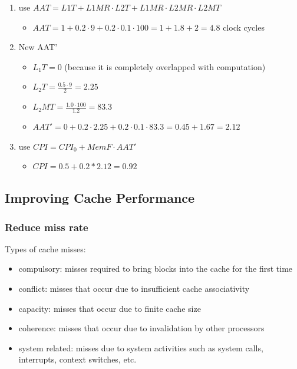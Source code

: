 \documentclass[12pt]{extarticle}
\begin{document}
	\begin{enumerate}
		\item use $AAT = L1T + L1MR \cdot L2T + L1MR \cdot L2MR \cdot L2MT$
		\begin{itemize}
			\item $AAT = 1 + 0.2 \cdot 9 + 0.2 \cdot 0.1 \cdot 100 = 1 + 1.8 + 2 = 4.8$ clock cycles
		\end{itemize}

		\item New AAT'
		\begin{itemize}
			\item $L_1T = 0$ (because it is completely overlapped with computation)
			\item $L_2T = \frac{0.5 \cdot 9}{2} = 2.25$
			\item $L_2MT = \frac{1.0 \cdot 100}{1.2} = 83.3$
			\item $AAT' = 0 + 0.2 \cdot 2.25 + 0.2 \cdot 0.1 \cdot 83.3 = 0.45 + 1.67 = 2.12$
		\end{itemize}

		\item use $CPI = CPI_0 + MemF  \cdot AAT'$
		\begin{itemize}
			\item $CPI = 0.5 + 0.2 * 2.12 = 0.92$
		\end{itemize}
	\end{enumerate}

	\subsection{Improving Cache Performance}

	\subsubsection{Reduce miss rate}

	Types of cache misses:

	\begin{itemize}
		\item compulsory: misses required to bring blocks into the cache for the first time
		\item conflict: misses that occur due to insufficient cache associativity
		\item capacity: misses that occur due to finite cache size
		\item coherence: misses that occur due to invalidation by other processors
		\item system related: misses due to system activities such as system calls, interrupts, context switches, etc.
	\end{itemize}
\end{document}
